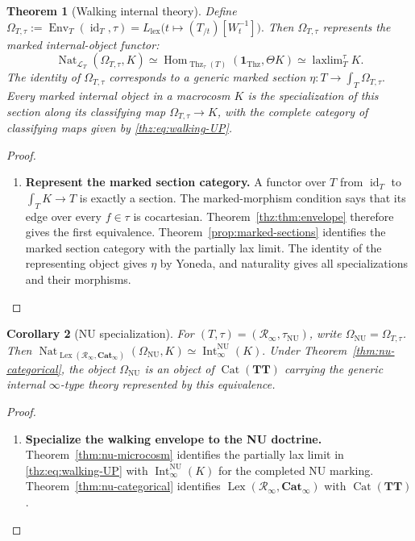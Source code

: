\documentclass[oneside]{article}
\theoremstyle{plain}
\newtheorem{theorem}{Theorem}[section]
\newtheorem{corollary}[theorem]{Corollary}
\theoremstyle{definition}
\theoremstyle{remark}
\newcommand{\Cat}{\mathbf{Cat}_{\infty}}
\newcommand{\Env}{\operatorname{Env}}
\newcommand{\Int}{\operatorname{Int}}
\newcommand{\Lex}{\operatorname{Lex}}
\newcommand{\NU}{\mathrm{NU}}
\newcommand{\Nat}{\operatorname{Nat}}
\newcommand{\RNU}{\mathcal R_{\infty}}
\newcommand{\TT}{\mathbf{TT}}
\newcommand{\Thz}{\operatorname{Thz}}
\newcommand{\id}{\operatorname{id}}
\newcommand{\one}{\mathbf 1}
\begin{document}
\begin{theorem}[Walking internal theory]\label{thz:thm:walking}
Define $\Omega_{T,\tau}:=\Env_T(\id_T,\tau) =L_{\mathrm{lex}} \bigl(t\mapsto (T_{/t})[W_t^{-1}]\bigr).$ Then $\Omega_{T,\tau}$ represents the marked internal-object functor:
\begin{equation}\label{thz:eq:walking-UP}
 \Nat_{\mathcal L_T}(\Omega_{T,\tau},K)
 \simeq
 \operatorname{Hom}_{\Thz_\tau(T)}
   (\one_{\Thz},\Theta K)
 \simeq
 \operatorname*{laxlim}\nolimits^{\tau}_T K.
\end{equation}
The identity of $\Omega_{T,\tau}$ corresponds to a generic marked section $\eta:T\longrightarrow\int_T\Omega_{T,\tau}.$ Every marked internal object in a macrocosm $K$ is the specialization of
this section along its classifying map $\Omega_{T,\tau}\to K$, with the
complete category of classifying maps given by
\eqref{thz:eq:walking-UP}.
\end{theorem}
\begin{proof}
\leavevmode
\begin{enumerate}
\item \textbf{Represent the marked section category.} A functor over $T$ from $\id_T$ to $\int_TK\to T$ is exactly a
section.  The marked-morphism condition says that its edge over every
$f\in\tau$ is cocartesian.  Theorem~\ref{thz:thm:envelope} therefore
gives the first equivalence.  Theorem~\ref{prop:marked-sections} identifies the
marked section category with the partially lax limit.  The identity of the
representing object gives $\eta$ by Yoneda, and naturality gives all
specializations and their morphisms.\qedhere
\end{enumerate}
\end{proof}

\begin{corollary}[NU specialization]\label{thz:cor:NU}
For $(T,\tau)=(\RNU,\tau_{\NU})$, write
$\Omega_{\NU}=\Omega_{T,\tau}$.  Then $\Nat_{\Lex(\RNU,\Cat)}(\Omega_{\NU},K) \simeq \Int^{\NU}_\infty(K).$ Under Theorem~\ref{thm:nu-categorical}, the object $\Omega_{\NU}$ is an object of
$\operatorname{Cat}(\TT)$ carrying the generic internal $\infty$-type
theory represented by this equivalence.
\end{corollary}
\begin{proof}
\leavevmode
\begin{enumerate}
\item \textbf{Specialize the walking envelope to the NU doctrine.} Theorem~\ref{thm:nu-microcosm} identifies the partially lax limit in
\eqref{thz:eq:walking-UP} with $\Int^{\NU}_\infty(K)$ for the
completed NU marking.  Theorem~\ref{thm:nu-categorical} identifies
$\Lex(\RNU,\Cat)$ with $\operatorname{Cat}(\TT)$.\qedhere
\end{enumerate}
\end{proof}
\end{document}
